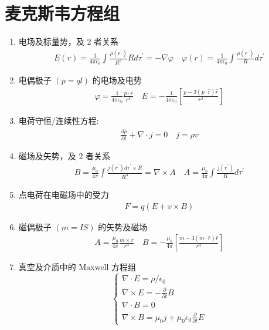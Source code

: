 \documentclass[../../note.tex]{subfiles}
\begin{document}
\section{麦克斯韦方程组}
\begin{enumerate}
	\item 电场及标量势，及 2 者关系
	\begin{align}
	E(r)=\frac{1}{4 \pi \epsilon_0} \int \frac{\rho\left(r^{\prime}\right)}{R^3} {R} d \tau^{\prime}=-\nabla \varphi \quad \varphi(r)=\frac{1}{4 \pi \epsilon_0} \int \frac{\rho\left(r^{\prime}\right)}{R} d \tau^{\prime}
	\end{align}
	\item 电偶极子 $(p=q l)$ 的电场及电势
	\begin{align}
	\varphi=\frac{1}{4 \pi \varepsilon_0} \frac{p \cdot r}{r^3} \quad E=-\frac{1}{4 \pi \varepsilon_0}\left[\frac{p-3(p \cdot \hat{r}) \hat{r}}{r^3}\right]
	\end{align}
	\item 电荷守恒/连续性方程:
	\begin{align}
	\frac{\partial \rho}{\partial t}+\nabla \cdot {j}=0 \quad {j}=\rho v
	\end{align}
	\item 磁场及矢势，及 2 者关系
	\begin{align}
	B=\frac{\mu_0}{4 \pi} \int \frac{j\left(r^{\prime}\right) d \tau^{\prime} \times R}{R^3}=\nabla \times A \quad A=\frac{\mu_0}{4 \pi} \int \frac{j\left(r^{\prime}\right)}{R} d \tau^{\prime}
	\end{align}
	\item 点电荷在电磁场中的受力
	\begin{align}
	{F}=q({E}+{v} \times {B})
	\end{align}
	\item 磁偶极子 $(m=I S)$ 的矢势及磁场
	\begin{align}
	A=\frac{\mu_0}{4 \pi} \frac{m \times r}{r^3} \quad B=-\frac{\mu_0}{4 \pi}\left[\frac{m-3(m \cdot \hat{r}) \hat{r}}{r^3}\right]
	\end{align}
	\item 真空及介质中的 Maxwell 方程组
	\begin{equation}
	\left\{\begin{array} { l } 
		{ \nabla \cdot  { E } = \rho / \epsilon _ { 0 } } \\
		{ \nabla \times  { E } = - \frac { \partial } { \partial t } B } \\
		{ \nabla \cdot  { B } = 0 } \\
		{ \nabla \times  { B } = \mu _ { 0 }  { j } + \mu _ { 0 } \epsilon _ { 0 } \frac { \partial } { \partial t }  { E } }

\end{array}
\end{equation}
\end{enumerate}
\end{document}

